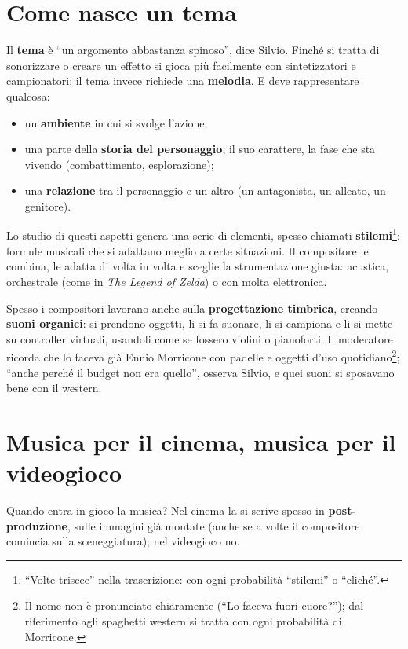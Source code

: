 \section{Come nasce un tema}
\label{sec:c1-5-tema}

Il \textbf{tema} è ``un argomento abbastanza spinoso'', dice Silvio. Finché si
tratta di sonorizzare o creare un effetto si gioca più facilmente con
sintetizzatori e campionatori; il tema invece richiede una \textbf{melodia}. E
deve rappresentare qualcosa:
\begin{itemize}
  \item un \textbf{ambiente} in cui si svolge l'azione;
  \item una parte della \textbf{storia del personaggio}, il suo carattere, la fase
        che sta vivendo (combattimento, esplorazione);
  \item una \textbf{relazione} tra il personaggio e un altro (un antagonista, un
        alleato, un genitore).
\end{itemize}
Lo studio di questi aspetti genera una serie di elementi, spesso chiamati
\textbf{stilemi}\footnote{``Volte triscee'' nella trascrizione: con ogni
probabilità ``stilemi'' o ``cliché''.}: formule musicali che si adattano meglio a
certe situazioni. Il compositore le combina, le adatta di volta in volta e sceglie
la strumentazione giusta: acustica, orchestrale (come in \emph{The Legend of
Zelda}) o con molta elettronica.

Spesso i compositori lavorano anche sulla \textbf{progettazione timbrica},
creando \textbf{suoni organici}: si prendono oggetti, li si fa suonare, li si
campiona e li si mette su controller virtuali, usandoli come se fossero violini o
pianoforti. Il moderatore ricorda che lo faceva già Ennio Morricone con padelle e
oggetti d'uso quotidiano\footnote{Il nome non è pronunciato chiaramente (``Lo
faceva fuori cuore?''); dal riferimento agli spaghetti western si tratta con ogni
probabilità di Morricone.}; ``anche perché il budget non era quello'', osserva
Silvio, e quei suoni si sposavano bene con il western.

\section{Musica per il cinema, musica per il videogioco}
\label{sec:c1-5-cinema}

Quando entra in gioco la musica? Nel cinema la si scrive spesso in
\textbf{post-produzione}, sulle immagini già montate (anche se a volte il
compositore comincia sulla sceneggiatura); nel videogioco no.

